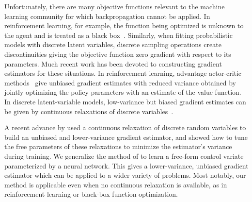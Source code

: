 \documentclass{article}
\begin{document}
Unfortunately, there are many objective functions relevant to the machine learning community for which backpropagation cannot be applied. In reinforcement learning, for example, the function being optimized is unknown to the agent and is treated as a black box~\citep{schulman2015gradient}. Similarly, when fitting probabilistic models with discrete latent variables, discrete sampling operations create discontinuities giving the objective function zero gradient with respect to its parameters.
Much recent work has been devoted to constructing gradient estimators for these situations.
In reinforcement learning, advantage actor-critic methods~\citep{sutton2000policy} give unbiased gradient estimates with reduced variance obtained by jointly optimizing the policy parameters with an estimate of the value function.
In discrete latent-variable models, low-variance but biased gradient estimates can be given by continuous relaxations of discrete variables~\citep{maddison2016concrete, jang2016categorical}.

A recent advance by \citet{tucker2017rebar} used a continuous relaxation of discrete random variables to build an unbiased and lower-variance gradient estimator,
and showed how to tune the free parameters of these relaxations to minimize the estimator's variance during training.
%
We generalize the method of \citet{tucker2017rebar} to learn a free-form control variate parameterized by a neural network.
This gives a lower-variance, unbiased gradient estimator which can be applied to a wider variety of problems.
Most notably, our method is applicable even when no continuous relaxation is available, as in reinforcement learning or black-box function optimization.
\end{document}
